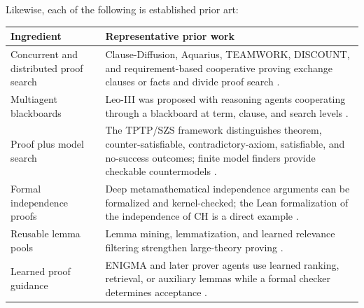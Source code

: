 \documentclass[11pt]{article}
\theoremstyle{definition}
\theoremstyle{remark}
\begin{document}
Likewise, each of the following is established prior art:
\begin{longtable}{@{}p{}p{}@{}}
\toprule
\textbf{Ingredient} & \textbf{Representative prior work} \\
\midrule
Concurrent and distributed proof search & Clause-Diffusion, Aquarius, TEAMWORK, DISCOUNT, and requirement-based cooperative proving exchange clauses or facts and divide proof search \cite{BonacinaHsiang1995,DenzingerKronenburgSchulz1997,Fuchs1998}. \\
Multiagent blackboards & Leo-III was proposed with reasoning agents cooperating through a blackboard at term, clause, and search levels \cite{WisniewskiBenzmuller2016}. \\
Proof plus model search & The TPTP/SZS framework distinguishes theorem, counter-satisfiable, contradictory-axiom, satisfiable, and no-success outcomes; finite model finders provide checkable countermodels \cite{SZS,McCune2003,RegerSudaVoronkov2016}. \\
Formal independence proofs & Deep metamathematical independence arguments can be formalized and kernel-checked; the Lean formalization of the independence of CH is a direct example \cite{HanVanDoorn2021}. \\
Reusable lemma pools & Lemma mining, lemmatization, and learned relevance filtering strengthen large-theory proving \cite{KaliszykUrban2015,KaliszykUrbanVyskocil2015}. \\
Learned proof guidance & ENIGMA and later prover agents use learned ranking, retrieval, or auxiliary lemmas while a formal checker determines acceptance \cite{JakubuvUrban2017,ProverAgent2025,AgentHunt2026}. \\
\bottomrule
\end{longtable}
\end{document}
